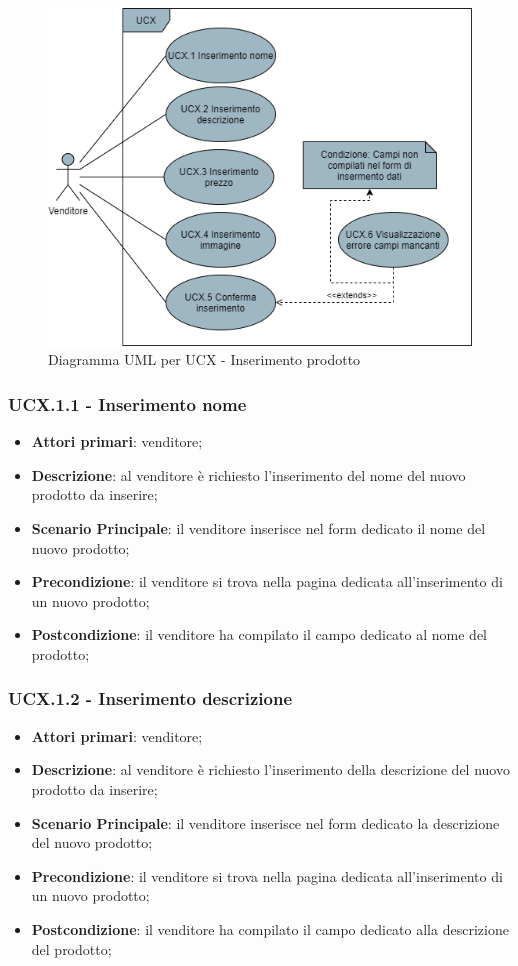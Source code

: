 \begin{figure}[H]
\centering
\includegraphics[scale=0.6]{res/UseCase/Immagini/InserimentoProdotto}
\caption{Diagramma UML per UCX - Inserimento prodotto}
\end{figure}

\subsubsection{UCX.1.1 - Inserimento nome}
\begin{itemize}
\item \textbf{Attori primari}: venditore;
\item \textbf{Descrizione}: al venditore è richiesto l'inserimento del nome del nuovo prodotto da inserire;
\item \textbf{Scenario Principale}: il venditore inserisce nel form dedicato il nome del nuovo prodotto;
\item \textbf{Precondizione}: il venditore si trova nella pagina dedicata all'inserimento di un nuovo prodotto;
\item \textbf{Postcondizione}: il venditore ha compilato il campo dedicato al nome del prodotto;
\end{itemize}

\subsubsection{UCX.1.2 - Inserimento descrizione}
\begin{itemize}
\item \textbf{Attori primari}: venditore;
\item \textbf{Descrizione}: al venditore è richiesto l'inserimento della descrizione del nuovo prodotto da inserire;
\item \textbf{Scenario Principale}: il venditore inserisce nel form dedicato la descrizione del nuovo prodotto;
\item \textbf{Precondizione}: il venditore si trova nella pagina dedicata all'inserimento di un nuovo prodotto;
\item \textbf{Postcondizione}: il venditore ha compilato il campo dedicato alla descrizione del prodotto;
\end{itemize}

